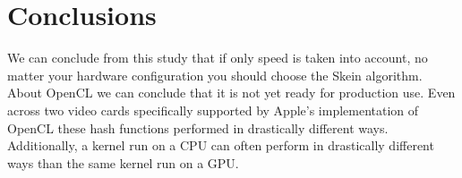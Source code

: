 \section*{Conclusions}

We can conclude from this study that if only speed is taken into account, no matter your hardware configuration you should choose the Skein algorithm.
About OpenCL we can conclude that it is not yet ready for production use.
Even across two video cards specifically supported by Apple's implementation of OpenCL these hash functions performed in drastically different ways.
Additionally, a kernel run on a CPU can often perform in drastically different ways than the same kernel run on a GPU.